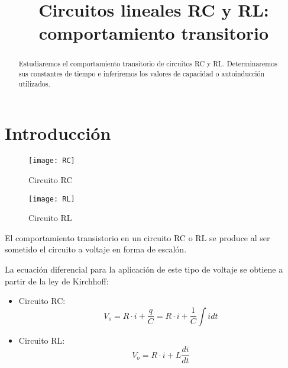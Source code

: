 \documentclass[a4paper,12pt,spanish]{article}
\begin{document}
	
	
	\title{Circuitos lineales RC y RL: comportamiento transitorio}
	
	\date{}
	
	\maketitle
	
	
	
	\begin{abstract} %
		
		Estudiaremos el comportamiento transitorio de circuitos RC y RL. Determinaremos sus constantes de tiempo e inferiremos los valores de capacidad o autoinducción utilizados.
		
	\end{abstract}

\section{Introducción}


\begin{table}[H]
	\begin{minipage}[t]{.48\linewidth}
		
		\begin{figure}[H]
			\centering
			\texttt{[image: RC]}
			\caption{Circuito RC}
			\label{fig:rc}
		\end{figure}
		
	\end{minipage}\hfill
	\mbox{}
	\begin{minipage}[t]{.48\linewidth}%
		
		
		\begin{figure}[H]
			\centering
			\texttt{[image: RL]}
			\caption{Circuito RL}
			\label{fig:rl}
		\end{figure}
		
	\end{minipage}\hfill
	\mbox{}
\end{table}




 

El comportamiento transistorio en un circuito RC o RL se produce al ser sometido el circuito a voltaje en forma de escalón.

La ecuación diferencial para la aplicación de este tipo de voltaje se obtiene a partir de la ley de Kirchhoff:
\begin{itemize}
	\item{Circuito RC:\\
		\[V_o = R\cdot i + \frac{q}{C} = R \cdot i + \frac{1}{C}\int i dt\]}
	\item{Circuito RL:\\
	\[V_o = R\cdot i + L \frac{di}{dt}\]}
\end{itemize}
\end{document}
